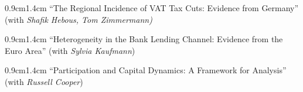 \documentclass[letterpaper,11pt]{article}
\begin{document}
 
   \vspace{0.1cm}
\begin{adjustwidth}{0.9cm}{1.4cm} ``The Regional Incidence of VAT Tax Cuts: Evidence from Germany'' (with \textit{Shafik Hebous, Tom Zimmermann)}\end{adjustwidth} 
 
 \vspace{0.1cm}
\begin{adjustwidth}{0.9cm}{1.4cm} ``Heterogeneity in the Bank Lending Channel: Evidence from the Euro Area'' (with \textit{Sylvia Kaufmann})\end{adjustwidth} 

 \vspace{0.1cm}
\begin{adjustwidth}{0.9cm}{1.4cm} ``Participation and Capital Dynamics: A Framework for Analysis'' (with \textit{Russell Cooper})\end{adjustwidth} 



\end{document}
